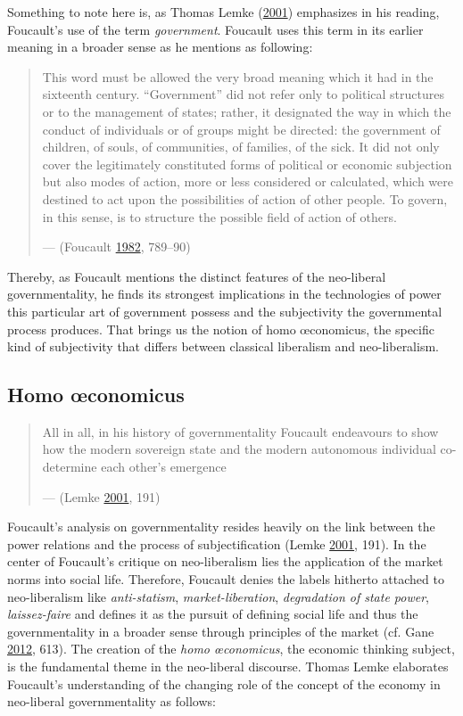 \documentclass[12pt,twoside]{report}
\begin{document}
Something to note here is, as Thomas Lemke (\protect\hyperlink{ref-Lemke2001}{2001}) emphasizes in his reading, Foucault's use of the term \emph{government}. Foucault uses this term in its earlier meaning in a broader sense as he mentions as following:

\begin{quote}
This word must be allowed the very broad meaning which it had in the sixteenth century. ``Government'' did not refer only to political structures or to the management of states; rather, it designated the way in which the conduct of individuals or of groups might be directed: the government of children, of souls, of communities, of families, of the sick. It did not only cover the legitimately constituted forms of political or economic subjection but also modes of action, more or less considered or calculated, which were destined to act upon the possibilities of action of other people. To govern, in this sense, is to structure the possible field of action of others.

--- (Foucault \protect\hyperlink{ref-Foucault1982}{1982}, 789--90)
\end{quote}

Thereby, as Foucault mentions the distinct features of the neo-liberal governmentality, he finds its strongest implications in the technologies of power this particular art of government possess and the subjectivity the governmental process produces. That brings us the notion of homo œconomicus, the specific kind of subjectivity that differs between classical liberalism and neo-liberalism.

\hypertarget{homo-conomicus}{%
\subsection{Homo œconomicus}\label{homo-conomicus}}

\begin{quote}
All in all, in his history of governmentality Foucault endeavours to show how the modern sovereign state and the modern autonomous individual co-determine each other's emergence

--- (Lemke \protect\hyperlink{ref-Lemke2001}{2001}, 191)
\end{quote}

Foucault's analysis on governmentality resides heavily on the link between the power relations and the process of subjectification (Lemke \protect\hyperlink{ref-Lemke2001}{2001}, 191). In the center of Foucault's critique on neo-liberalism lies the application of the market norms into social life. Therefore, Foucault denies the labels hitherto attached to neo-liberalism like \emph{anti-statism}, \emph{market-liberation}, \emph{degradation of state power}, \emph{laissez-faire} and defines it as the pursuit of defining social life and thus the governmentality in a broader sense through principles of the market (cf. Gane \protect\hyperlink{ref-Gane2012}{2012}, 613). The creation of the \emph{homo œconomicus}, the economic thinking subject, is the fundamental theme in the neo-liberal discourse. Thomas Lemke elaborates Foucault's understanding of the changing role of the concept of the economy in neo-liberal governmentality as follows:
\end{document}

